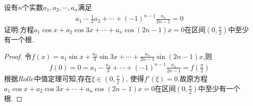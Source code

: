 \documentclass[lang=cn,newtx,10pt,scheme=chinese]{../Template/elegantbook}
\begin{document}
\begin{exercise}
    设有\(n\)个实数\(a_1,a_2,\cdots,a_n\)满足
    \begin{gather}
        a_{1}-\frac{1}{3}a_{2}+\cdots+(-1)^{n - 1}\frac{a_{n}}{2n - 1}=0
    \nonumber
    \end{gather}
    证明:方程\(a_1\cos x + a_2\cos3x+\cdots+a_n\cos(2n - 1)x = 0\)在区间\((0,\frac{\pi}{2})\)中至少有一个根.
\end{exercise}
    \begin{proof}
        令$f\left( x \right) =a_1\sin x+\frac{a_2}{3}\sin 3x+\cdots +\frac{a_n}{2n-1}\sin \left( 2n-1 \right) x$,则
        \begin{gather}
            f\left( 0 \right) =0=a_1-\frac{a_2}{3}+\cdots +\left( -1 \right) ^{n-1}\frac{a_n}{2n-1}=f\left( \frac{\pi}{2} \right) 
            \nonumber
        \end{gather}
        根据$Rolle$中值定理可知,存在$\xi\in(0,\frac{\pi}{2})$,
        使得$f'(\xi)=0$.故原方程\(a_1\cos x + a_2\cos3x+\cdots+a_n\cos(2n - 1)x = 0\)在区间\((0,\frac{\pi}{2})\)中至少有一个根.
    \end{proof}
\end{document}
